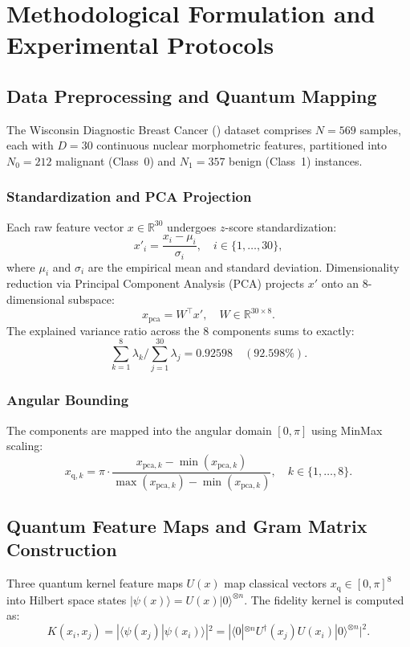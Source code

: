 \section{Methodological Formulation and Experimental Protocols}
\label{sec:methods-formal}

\subsection{Data Preprocessing and Quantum Mapping}
The Wisconsin Diagnostic Breast Cancer (\wdbc) dataset comprises $N=569$ samples, each with $D=30$ continuous nuclear morphometric features, partitioned into $N_0 = 212$ malignant (Class~0) and $N_1 = 357$ benign (Class~1) instances.

\subsubsection{Standardization and PCA Projection}
Each raw feature vector $x \in \mathbb{R}^{30}$ undergoes $z$-score standardization:
\begin{equation}
x'_i = \frac{x_i - \mu_i}{\sigma_i}, \quad i \in \{1, \dots, 30\},
\end{equation}
where $\mu_i$ and $\sigma_i$ are the empirical mean and standard deviation. Dimensionality reduction via Principal Component Analysis (PCA) projects $x'$ onto an 8-dimensional subspace:
\begin{equation}
x_{\mathrm{pca}} = W^\top x', \quad W \in \mathbb{R}^{30 \times 8}.
\end{equation}
The explained variance ratio across the 8 components sums to exactly:
\begin{equation}
\sum_{k=1}^8 \lambda_k / \sum_{j=1}^{30} \lambda_j = 0.92598 \quad (92.598\%).
\end{equation}

\subsubsection{Angular Bounding}
The components are mapped into the angular domain $[0, \pi]$ using MinMax scaling:
\begin{equation}
x_{\mathrm{q}, k} = \pi \cdot \frac{x_{\mathrm{pca}, k} - \min(x_{\mathrm{pca}, k})}{\max(x_{\mathrm{pca}, k}) - \min(x_{\mathrm{pca}, k})}, \quad k \in \{1, \dots, 8\}.
\end{equation}

\subsection{Quantum Feature Maps and Gram Matrix Construction}
Three quantum kernel feature maps $U(x)$ map classical vectors $x_{\mathrm{q}} \in [0, \pi]^8$ into Hilbert space states $|\psi(x)\rangle = U(x)|0\rangle^{\otimes n}$. The fidelity kernel is computed as:
\begin{equation}
K(x_i, x_j) = |\langle\psi(x_j)|\psi(x_i)\rangle|^2 = |\langle 0|^{\otimes n} U^\dagger(x_j) U(x_i) |0\rangle^{\otimes n}|^2.
\end{equation}

